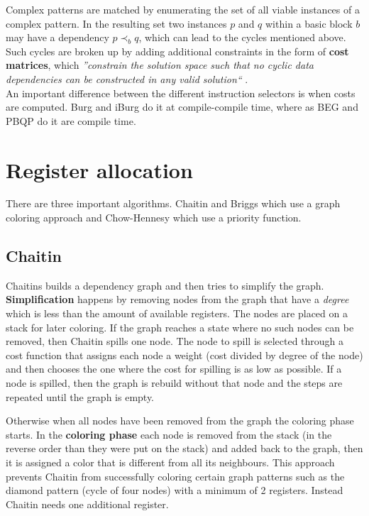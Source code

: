 \documentclass[a4paper,10pt]{article}
\begin{document}
Complex patterns are matched by enumerating the set of all viable instances of a complex pattern. In the resulting set two instances $p$
and $q$ within a basic block $b$ may have a dependency $p \prec_b q$, which can lead to the cycles mentioned above. Such cycles are
broken up by adding additional constraints in the form of \textbf{cost matrices}, which \textit{''constrain the solution space such that
no cyclic data dependencies can be constructed in any valid solution``} \cite{pbqp-instruction-selection}.\\

An important difference between the different instruction selectors is when costs are computed. Burg and iBurg do it at compile-compile
time, where as BEG and PBQP do it are compile time.

\section{Register allocation}
\label{sec:register-allocation}
There are three important algorithms. Chaitin and Briggs which use a graph coloring approach and Chow-Hennesy which use a priority
function.

\subsection{Chaitin}
Chaitins builds a dependency graph and then tries to simplify the graph. \textbf{Simplification} happens by removing nodes
       from the graph that have a \textit{degree} which is less than the amount of available registers. The nodes are placed on a stack
       for later coloring. If the graph reaches a state where no such nodes can be removed, then Chaitin spills one node. The node to
       spill is selected through a cost function that assigns each node a weight (cost divided by degree of the node) and then chooses
       the
       one where the cost for spilling is as low as possible. If a node is spilled, then the graph is rebuild without that node and the
       steps are repeated until the graph is empty.

       Otherwise when all nodes have been removed from the graph the coloring phase starts. In the \textbf{coloring phase} each node is
       removed from the stack (in the reverse order than they were put on the stack) and added back to the graph, then it is assigned a
       color that is different from all its neighbours. This approach prevents Chaitin from successfully coloring certain graph patterns
       such as the diamond pattern (cycle of four nodes) with a minimum of 2 registers. Instead Chaitin needs one additional register.
\end{document}
